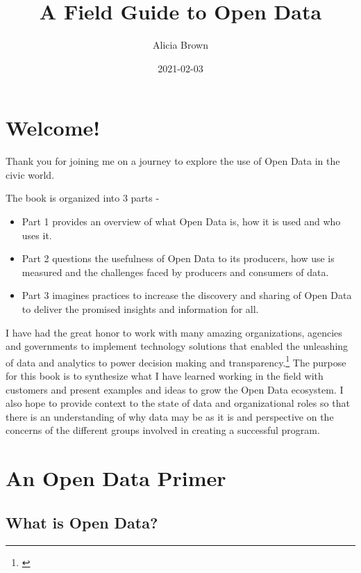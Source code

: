 \documentclass[
  openany]{book}
\title{A Field Guide to Open Data}
\author{Alicia Brown}
\date{2021-02-03}
\providecommand{\tightlist}{%
  \setlength{\itemsep}{0pt}\setlength{\parskip}{0pt}}
\begin{document}
\maketitle

{
\setcounter{tocdepth}{1}
\tableofcontents
}
\hypertarget{welcome}{%
\chapter{Welcome!}\label{welcome}}

Thank you for joining me on a journey to explore the use of Open Data in the civic world.

The book is organized into 3 parts -

\begin{itemize}
\tightlist
\item
  Part 1 provides an overview of what Open Data is, how it is used and who uses it.
\item
  Part 2 questions the usefulness of Open Data to its producers, how use is measured and the challenges faced by producers and consumers of data.
\item
  Part 3 imagines practices to increase the discovery and sharing of Open Data to deliver the promised insights and information for all.
\end{itemize}

I have had the great honor to work with many amazing organizations, agencies and governments to implement technology solutions that enabled the unleashing of data and analytics to power decision making and transparency.\footnote{\citet{blog5years}} The purpose for this book is to synthesize what I have learned working in the field with customers and present examples and ideas to grow the Open Data ecosystem. I also hope to provide context to the state of data and organizational roles so that there is an understanding of why data may be as it is and perspective on the concerns of the different groups involved in creating a successful program.

\hypertarget{overview}{%
\chapter{An Open Data Primer}\label{overview}}

\hypertarget{what-is-open-data}{%
\section{What is Open Data?}\label{what-is-open-data}}
\end{document}

